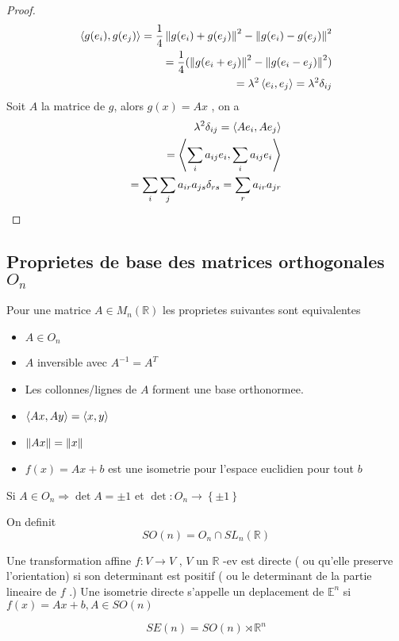 \documentclass[../main.tex]{subfiles}
\begin{document}
\begin{proof}
	\begin{align*}
	\left\langle g( e_i) , g( e_j) \right\rangle = \frac{1}{4}\left\lVert g( e_i) + g( e_j) \right\rVert ^{2} - \left\lVert g( e_i) - g( e_j) \right\rVert ^{2}\\
	= \frac{1}{4} ( \left\lVert g( e_i + e_j) \right\rVert ^{2} - \left\lVert g( e_i-e_j) \right\rVert ^{2}) \\
	= \lambda^{2} \left\langle e_i, e_j\right\rangle = \lambda^{2} \delta_{i j} \\
	\end{align*}
	Soit $A$ la matrice de $g$, alors $g( x) =Ax$ , on a
	\begin{align*}
	\lambda^{2}\delta_{ij} = \left\langle Ae_i, Ae_j\right\rangle \\
	= \left\langle \sum_i a_{ij} e_i, \sum_i a_{ij} e_i\right\rangle \\
	= \sum_i \sum_j a_{ir} a_{js} \delta_{rs} = \sum_r a_{ir} a_{jr} 
	\end{align*}
	

\end{proof}
\subsection{Proprietes de base des matrices orthogonales $O_n$ }
Pour une matrice $A \in M_n( \mathbb{R}) $ les proprietes suivantes sont equivalentes
\begin{itemize}
\item $A \in O_n$ 
\item $A$ inversible avec $A^{-1}= A^{T}$ 
\item Les collonnes/lignes de $A$ forment une base orthonormee.
\item $ \left\langle Ax, Ay\right\rangle = \left\langle x,y\right\rangle $ 
\item $\left\lVert Ax\right\rVert = \left\lVert x\right\rVert$ 
\item $f( x) =Ax +b$ est une isometrie pour l'espace euclidien pour tout $b$ 
\end{itemize}
\begin{rmq}
Si $A \in O_n \Rightarrow \det A = \pm 1$ et $\det: O_n \to \left\{ \pm 1 \right\} $ 

\end{rmq}
\begin{defn}
	On definit
	\[ 
		SO( n) = O_n \cap SL_n( \mathbb{R}) 
	\]
\end{defn}
\begin{defn}
	Une transformation affine $f: V \to V $ , $V$ un $\mathbb{R}$ -ev est directe ( ou qu'elle preserve l'orientation) si son determinant est positif ( ou le determinant de la partie lineaire de $f$ .) 
	Une isometrie directe s'appelle un deplacement de $\mathbb{E}^{n}$ si $f( x) = Ax+b, A \in SO( n) $
\end{defn}
\begin{rmq}
\[ 
	SE( n) = SO( n) \rtimes \mathbb{R}^n
\]

\end{rmq}
\end{document}
